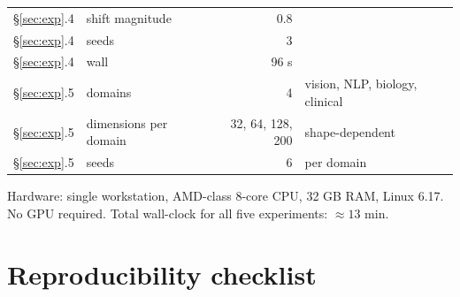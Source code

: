 \begin{center}
\begin{tabular}{llrl}
\S\ref{sec:exp}.4 & shift magnitude         & 0.8              &   \\
\S\ref{sec:exp}.4 & seeds                   & 3                &   \\
\S\ref{sec:exp}.4 & wall                    & 96 s             &   \\
\midrule
\S\ref{sec:exp}.5 & domains                 & 4                & vision, NLP, biology, clinical  \\
\S\ref{sec:exp}.5 & dimensions per domain   & 32, 64, 128, 200 & shape-dependent  \\
\S\ref{sec:exp}.5 & seeds                   & 6                & per domain  \\
\bottomrule
\end{tabular}
\end{center}

Hardware: single workstation, AMD-class 8-core CPU, 32 GB RAM,
Linux 6.17. No GPU required. Total wall-clock for all five
experiments: $\approx 13$ min.


\section*{Reproducibility checklist}

